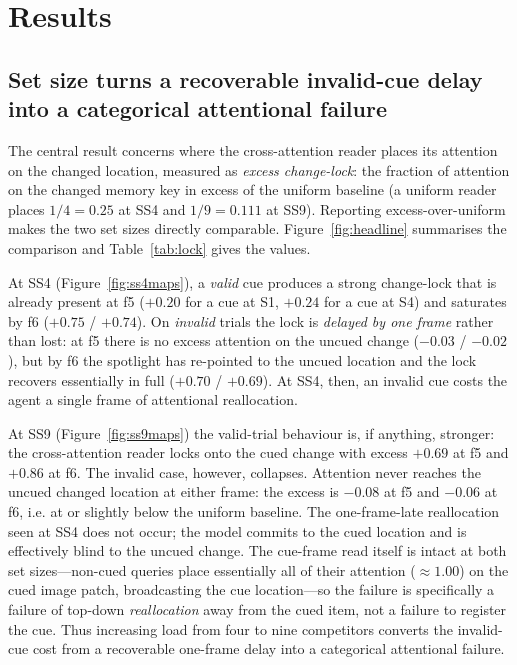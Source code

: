 \section{Results}

\subsection{Set size turns a recoverable invalid-cue delay into a categorical attentional failure}

The central result concerns where the cross-attention reader places its attention on the changed location, measured as \emph{excess change-lock}: the fraction of attention on the changed memory key in excess of the uniform baseline (a uniform reader places $1/4=0.25$ at SS4 and $1/9=0.111$ at SS9). Reporting excess-over-uniform makes the two set sizes directly comparable. Figure~\ref{fig:headline} summarises the comparison and Table~\ref{tab:lock} gives the values.

At SS4 (Figure~\ref{fig:ss4maps}), a \emph{valid} cue produces a strong change-lock that is already present at f5 ($+0.20$ for a cue at S1, $+0.24$ for a cue at S4) and saturates by f6 ($+0.75$ / $+0.74$). On \emph{invalid} trials the lock is \emph{delayed by one frame} rather than lost: at f5 there is no excess attention on the uncued change ($-0.03$ / $-0.02$), but by f6 the spotlight has re-pointed to the uncued location and the lock recovers essentially in full ($+0.70$ / $+0.69$). At SS4, then, an invalid cue costs the agent a single frame of attentional reallocation.

At SS9 (Figure~\ref{fig:ss9maps}) the valid-trial behaviour is, if anything, stronger: the cross-attention reader locks onto the cued change with excess $+0.69$ at f5 and $+0.86$ at f6. The invalid case, however, collapses. Attention never reaches the uncued changed location at either frame: the excess is $-0.08$ at f5 and $-0.06$ at f6, i.e. at or slightly below the uniform baseline. The one-frame-late reallocation seen at SS4 does not occur; the model commits to the cued location and is effectively blind to the uncued change. The cue-frame read itself is intact at both set sizes---non-cued queries place essentially all of their attention (${\approx}1.00$) on the cued image patch, broadcasting the cue location---so the failure is specifically a failure of top-down \emph{reallocation} away from the cued item, not a failure to register the cue. Thus increasing load from four to nine competitors converts the invalid-cue cost from a recoverable one-frame delay into a categorical attentional failure.

